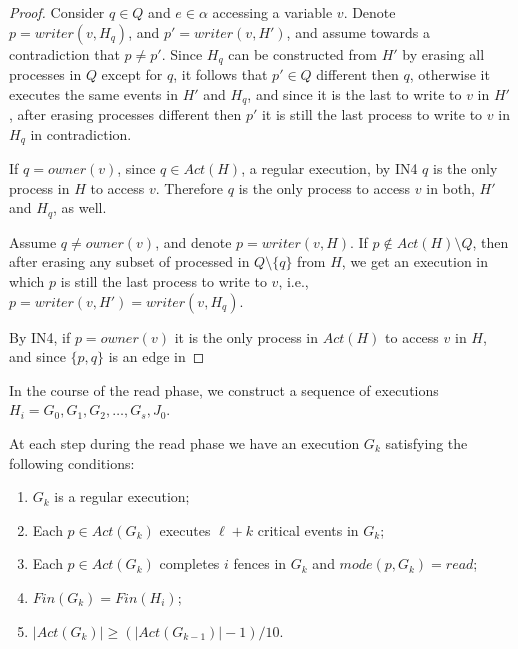 \begin{proof}
	Consider $q \in Q$ and $e \in \alpha$ accessing a variable $v$.
	Denote $p = writer(v,H_q)$, and $p' = writer(v,H')$, and assume towards a contradiction that $p \neq p'$. Since $H_q$ can be constructed from $H'$ by erasing all processes in $Q$ except for $q$, it follows that $p' \in Q$ different then $q$, otherwise it executes the same events in $H'$ and $H_q$, and since it is the last to write to $v$ in $H'$, after erasing processes different then $p'$ it is still the last process to write to $v$ in $H_q$ in contradiction.
	
	
	
	If $q = owner(v)$, since $q \in Act(H)$, a regular execution, by IN4 $q$ is the only process in $H$ to access $v$. Therefore $q$ is the only process to access $v$ in both, $H'$ and $H_q$, as well.
	
	Assume $q \neq owner(v)$, and denote $p = writer(v,H)$. If $p \notin Act(H) \setminus Q$, then after erasing any subset of processed in $Q \setminus \{q\}$ from $H$, we get an execution in which $p$ is still the last process to write to $v$, i.e., $p = writer(v,H') = writer(v,H_q)$.
	
	By IN4, if $p = owner(v)$ it is the only process in $Act(H)$ to access $v$ in $H$, and since $\{p,q\}$ is an edge in 
\end{proof}



















\newpage
In the course of the read phase, we construct a sequence of executions $H_i=G_0,G_1,G_2,\ldots,G_s, J_0$.

\begin{lemma} \label{read-phase-lemma}
	At each step during the read phase we have an execution $G_k$ satisfying the following conditions:
	\begin{enumerate}[(1)]
		\item $G_k$ is a regular execution;
		\item Each $p \in Act(G_k)$ executes $\ell+k$ critical events in $G_k$;
		\item Each $p \in Act(G_k)$ completes $i$ fences in $G_k$ and $mode(p,G_k) = read$;
		\item $Fin(G_k) = Fin(H_i)$;
		\item $|Act(G_k)| \geq (|Act(G_{k-1})|-1)/10$.
	\end{enumerate}
\end{lemma}

